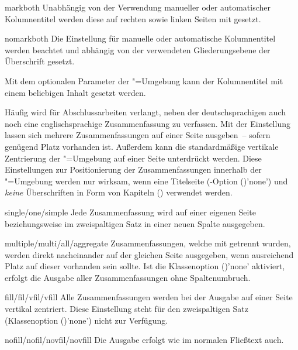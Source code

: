 \begin{Declaration*}{}
\begin{Declaration*}{}
\begin{Declaration*}{}
\begin{Declaration}[%
  v2.02!\Option{abstract=multiple}:ersetzt \Option{abstract=double};%
  v2.02!\Option{abstract=tocleveldown};%
  v2.02!\Option{abstract=markboth};%
  v2.04!\Option{abstract=tocmultiple}%
]{}
%
\begin{values}{}
\item[markboth]
  Unabhängig von der Verwendung manueller oder automatischer Kolumnentitel 
  werden diese auf rechten sowie linken Seiten mit  gesetzt.
\item[nomarkboth]
  Die Einstellung für manuelle oder automatische Kolumnentitel werden beachtet 
  und abhängig von der verwendeten Gliederungsebene der Überschrift gesetzt.
\end{values}
%
Mit dem optionalen Parameter  der 
"=Umgebung kann der Kolumnentitel mit einem beliebigen 
Inhalt gesetzt werden.

Häufig wird für Abschlussarbeiten verlangt, neben der deutschsprachigen auch 
noch eine englischsprachige Zusammenfassung zu verfassen. Mit der Einstellung 
 lassen sich mehrere Zusammenfassungen auf einer 
Seite ausgeben~-- sofern genügend Platz vorhanden ist. Außerdem kann die 
standardmäßige vertikale Zentrierung der "=Umgebung 
auf einer Seite unterdrückt werden. Diese Einstellungen zur Positionierung der 
Zusammenfassungen innerhalb der "=Umgebung werden nur 
wirksam, wenn eine Titelseite
(\KOMAScript-Option ()'none') und 
\emph{keine} Überschriften in Form von Kapiteln () 
verwendet werden.
%
\begin{values}{}
\item[single/one/simple]
  Jede Zusammenfassung wird auf einer eigenen Seite
  beziehungsweise im zweispaltigen Satz in einer neuen Spalte ausgegeben.
\item[multiple/multi/all/aggregate]
  Zusammenfassungen, welche mit  getrennt wurden, werden 
  direkt nacheinander auf der gleichen Seite ausgegeben, wenn ausreichend Platz 
  auf dieser vorhanden sein sollte. Ist die Klassenoption 
  ()'none' aktiviert, erfolgt die Ausgabe 
  aller Zusammenfassungen ohne Spaltenumbruch.
\item[fill/fil/vfil/vfill]
  Alle Zusammenfassungen werden bei der Ausgabe auf einer Seite vertikal 
  zentriert. Diese Einstellung steht für den zweispaltigen Satz
  (Klassenoption ()'none') nicht zur 
  Verfügung.
\item[nofill/nofil/novfil/novfill]
  Die Ausgabe erfolgt wie im normalen Fließtext auch.
\end{values}
\end{Declaration}


\end{Declaration*}
\end{Declaration*}
\end{Declaration*}
